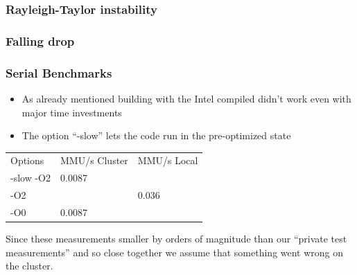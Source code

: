 \begin{frame}
	\frametitle{Rayleigh-Taylor instability}
	\begin{figure}[h!]
		\centering    
	\end{figure} 
\end{frame}

\begin{frame}
	\frametitle{Falling drop}
	\begin{figure}[h!]
		\centering    
	\end{figure} 
\end{frame}

\begin{frame}
	\frametitle{Serial Benchmarks}
	\large
	\begin{itemize}
		\item As already mentioned building with the Intel compiled didn't work even with major time investments
		\item The option "`-slow"' lets the code run in the pre-optimized state
	\end{itemize}
	
	\Large
	\centering
	\begin{tabular}{lll}
		Options & MMU/s Cluster & MMU/s Local\\
		-slow -O2 & 0.0087 & \\
		-O2 & & 0.036\\
		-O0 & 0.0087 &\\	
	\end{tabular}

	\large
	Since these measurements smaller by orders of magnitude than our "`private test measurements"' and so close together we assume that something went wrong on the cluster.

\end{frame}

